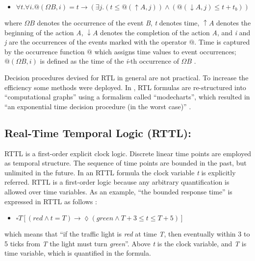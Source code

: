 \documentclass[11pt]{article}
\begin{document}
\begin{itemize}
\item $\forall t.\forall i.@(\Omega B,i)=t \rightarrow(\exists j.(t \leq @(\uparrow A,j))\wedge(@(\downarrow A,j)\leq t+t_{b}))$
\end{itemize}

\noindent where $\Omega B$ denotes the occurrence of the event \emph{B}, \emph{t} denotes time, \emph{$\uparrow A$} denotes the beginning of the action \emph{A}, \emph{$\downarrow A$} denotes the completion of the action \emph{A}, and \emph{i} and \emph{j} are the occurrences of the events marked with the operator $@$. Time is captured by the occurrence function $@$ which assigns time values to event occurrences; $@(\Omega B,i)$ is defined as the time of the \emph{i}-th occurrence of $\Omega B$ \cite{Ost92}.

Decision procedures devised for RTL in general are not practical. To increase the efficiency some methods were deployed. In \cite{JS88}, RTL formulas are re-structured into ``computational graphs'' using a formalism called ``modecharts'',  which resulted in ``an exponential time decision procedure (in the worst case)'' \cite{Ost92}. 

\subsection{Real-Time Temporal Logic (RTTL):}

RTTL \cite{OW87,Ost89} is a first-order explicit clock logic. Discrete linear time points are employed as temporal structure. The sequence of time points are bounded in the past, but unlimited in the future. In an RTTL formula the clock variable  \emph{t} is explicitly referred. RTTL is a first-order logic because any arbitrary quantification is allowed over time variables. 
As an example, ``the bounded response time'' is expressed in RTTL as follows \cite{Ost92}:

\begin{itemize}
\item $\square T [(red \wedge t=T) \rightarrow \lozenge (green \wedge T+3\leq t \leq T+5)]$
\end{itemize}

\noindent which means that ``if the traffic light is \emph{red} at time \emph{T}, then eventually within 3 to 5 ticks from \emph{T} the light must turn \emph{green}''. Above \emph{t} is the clock variable, and  \emph{T} is time variable, which is quantified in the formula. 
\end{document}
